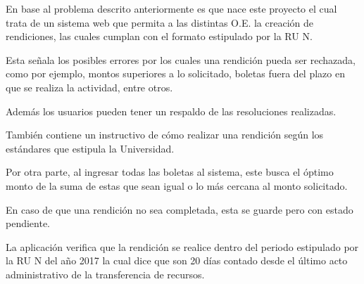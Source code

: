 En base al problema descrito anteriormente es que nace este proyecto el cual trata de un sistema web que permita a las distintas O.E. la creación de rendiciones, las cuales cumplan con el formato estipulado por la RU N.

Esta señala los posibles errores por los cuales una rendición pueda ser rechazada, como por ejemplo, montos superiores a lo solicitado, boletas fuera del plazo en que se realiza la actividad, entre otros.

Además los usuarios pueden tener un respaldo de las resoluciones realizadas.

También contiene un instructivo de cómo realizar una rendición según los estándares que estipula la Universidad.   

Por otra parte, al ingresar todas las boletas al sistema, este busca el óptimo monto de la suma de estas que sean igual o lo más cercana al monto solicitado.

En caso de que una rendición no sea completada, esta se guarde pero con estado pendiente.

La aplicación verifica que la rendición se realice dentro del periodo estipulado por la RU N del año 2017 la cual dice que son 20 días contado desde el último acto administrativo de la transferencia de recursos.